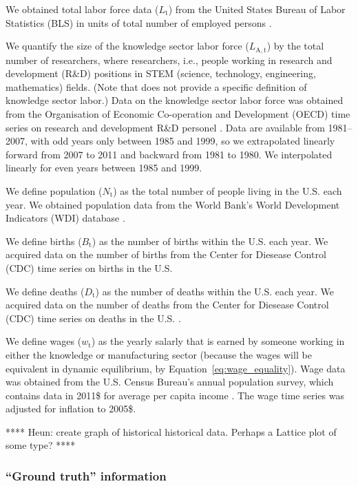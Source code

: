 \documentclass[letterpaper,12pt]{article}
\begin{document}
We obtained total labor force data ($L_\mathrm{t}$) from the United States Bureau of Labor Statistics (BLS) in units of total number of employed persons \citep{BLS:2013a}. 

We quantify the size of the knowledge sector labor force ($L_\mathrm{A,t}$) by the total number of researchers, where researchers, i.e., people working in research and development (R\&D) positions in STEM (science, technology, engineering, mathematics) fields. (Note that \citet{Jones:2001wn} does not provide a specific definition of knowledge sector labor.) Data on the knowledge sector labor force was obtained from the Organisation of Economic Co-operation and Development (OECD) time series on research and development R\&D personel \citep{OECDStatExtracts:2013a}. Data are available from 1981--2007, with odd years only between 1985 and 1999, so we extrapolated linearly forward from 2007 to 2011 and backward from 1981 to 1980. We interpolated linearly for even years between 1985 and 1999.

We define population ($N_\mathrm{t}$) as the total number of people living in the U.S. each year. We obtained population data from the World Bank's World Development Indicators (WDI) database \citep{WorldBankWDI:2013a}.

We define births ($B_\mathrm{t}$) as the number of births within the U.S. each year. We acquired data on the number of births from the Center for Diesease Control (CDC) time series on births in the U.S. \citep{Martin:2012tc, Hamilton:2012ww}

We define deaths ($D_\mathrm{t}$) as the number of deaths within the U.S. each year. We acquired data on the number of deaths from the Center for Diesease Control (CDC) time series on deaths in the U.S. \citep{Murphy:2013vg, Hoyert:2012tv}.

We define wages ($w_\mathrm{t}$) as the yearly salarly that is earned by someone working in either the knowledge or manufacturing sector (because the wages will be equivalent in dynamic equilibrium, by Equation~\ref{eq:wage_equality}). Wage data was obtained from the U.S. Census Bureau's annual population survey, which contains data in 2011\$ for average per capita income \citep[Table~P-1, \texttt{All Races}]{USCB:2013a}. The wage time series was adjusted for inflation to 2005\$.

**** Heun: create graph of historical historical data. Perhaps a Lattice plot of some type? ****

\subsubsection{``Ground truth'' information}
\label{sec:basic_model_ground_truth}
\end{document}

